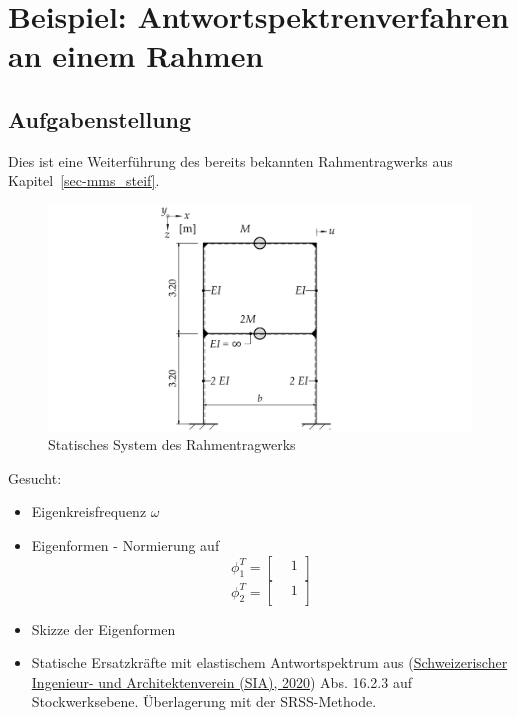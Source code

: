 \documentclass[
  letterpaper,
  DIV=11]{scrreprt}
\begin{document}
\hypertarget{beispiel-antwortspektrenverfahren-an-einem-rahmen}{%
\chapter{Beispiel: Antwortspektrenverfahren an einem
Rahmen}\label{beispiel-antwortspektrenverfahren-an-einem-rahmen}}

\hypertarget{aufgabenstellung-13}{%
\section{Aufgabenstellung}\label{aufgabenstellung-13}}

Dies ist eine Weiterführung des bereits bekannten Rahmentragwerks aus
Kapitel~\ref{sec-mms_steif}.

\begin{figure}[H]

{\centering \includegraphics{index_files/mediabag/bilder/aufgabe_mms_steif_system.pdf}

}

\caption{\label{fig-mms_antwort_system_mms2}Statisches System des
Rahmentragwerks}

\end{figure}

Gesucht:

\begin{itemize}
\item
  Eigenkreisfrequenz \(\omega\)
\item
  Eigenformen - Normierung auf \[\phi_1^T = 
  \begin{bmatrix}
   &  1\\
  \end{bmatrix} \] \[\phi_2^T =
  \begin{bmatrix}
   &  1\\
  \end{bmatrix}\]
\item
  Skizze der Eigenformen
\item
  Statische Ersatzkräfte mit elastischem Antwortspektrum aus
  (\protect\hyperlink{ref-SIA261_2020}{Schweizerischer Ingenieur- und
  Architektenverein (SIA), 2020}) Abs. 16.2.3 auf Stockwerksebene.
  Überlagerung mit der SRSS-Methode.
\end{itemize}
\end{document}
